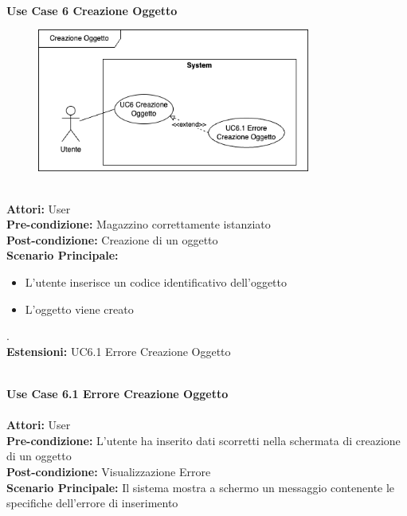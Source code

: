 \Large\textbf{}\\
\Large\textbf{Use Case 6 Creazione Oggetto} \\
\vspace{0.5cm}
\begin{figure}[h]
 \centering
 \includegraphics[width=0.8\textwidth]{UseCasesImages/ObjCreation.png}
\end{figure}

\large\textbf{} \\
\textbf{Attori:} User\\
\textbf{Pre-condizione:} Magazzino correttamente istanziato \\
\textbf{Post-condizione: } Creazione di un oggetto\\
\textbf{Scenario Principale:}\\
\begin{itemize}
  \item L'utente inserisce un codice identificativo dell'oggetto
  \item L'oggetto viene creato
\end{itemize}.\\
\textbf{Estensioni: } UC6.1 Errore Creazione Oggetto\\

\vspace{0.5cm}

{}

\vspace{0.5cm}

\Large\textbf{}\\
\Large\textbf{Use Case 6.1 Errore Creazione Oggetto} \\
\large\textbf{} \\
\textbf{Attori:} User\\
\textbf{Pre-condizione:} L'utente ha inserito dati scorretti nella schermata di creazione di un oggetto\\
\textbf{Post-condizione: } Visualizzazione Errore\\
\textbf{Scenario Principale:} Il sistema mostra a schermo un messaggio contenente le specifiche dell'errore di inserimento\\

